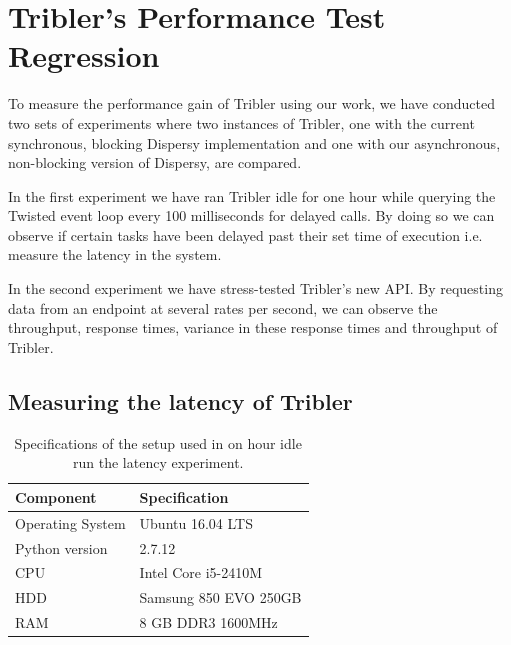 \section{Tribler's Performance Test Regression}
\label{sct:tribler_performance_regression}

To measure the performance gain of Tribler using our work, we have conducted two sets of experiments where two instances of Tribler, one with the current synchronous, blocking Dispersy implementation and one with our asynchronous, non-blocking version of Dispersy, are compared.

In the first experiment we have ran Tribler idle for one hour while querying the Twisted event loop every 100 milliseconds for delayed calls.
By doing so we can observe if certain tasks have been delayed past their set time of execution i.e. measure the latency in the system.

In the second experiment we have stress-tested Tribler's new API.
By requesting data from an endpoint at several rates per second, we can observe the throughput, response times, variance in these response times and throughput of Tribler.

\subsection{Measuring the latency of Tribler}

\begin{table}[h]
	\centering
	\caption{Specifications of the setup used in on hour idle run the latency experiment.}
	\label{table:specs_hp_elitebook}
	\begin{tabular}{l|l}
		\hline
		\textbf{Component}	& \textbf{Specification} \\ \hline
		Operating System   	& Ubuntu 16.04 LTS \\
		Python version		& 2.7.12 \\
		CPU					& Intel Core i5-2410M \\ 
		HDD					& Samsung 850 EVO 250GB  \\ 
		RAM					& 8 GB DDR3 1600MHz \\
	\end{tabular}
\end{table}

